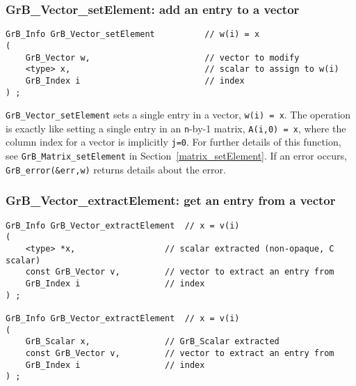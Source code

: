\documentclass[12pt]{article}
\begin{document}
\newpage
\subsubsection{{\sf GrB\_Vector\_setElement:}    add an entry to a vector}
\label{vector_setElement}

\begin{mdframed}[userdefinedwidth=6in]
{\footnotesize
\begin{verbatim}
GrB_Info GrB_Vector_setElement          // w(i) = x
(
    GrB_Vector w,                       // vector to modify
    <type> x,                           // scalar to assign to w(i)
    GrB_Index i                         // index
) ;
\end{verbatim} } \end{mdframed}

\verb'GrB_Vector_setElement' sets a single entry in a vector, \verb'w(i) = x'.
The operation is exactly like setting a single entry in an \verb'n'-by-1
matrix, \verb'A(i,0) = x', where the column index for a vector is implicitly
\verb'j=0'.  For further details of this function, see
\verb'GrB_Matrix_setElement' in Section~\ref{matrix_setElement}.
If an error occurs, \verb'GrB_error(&err,w)' returns details about the error.

\subsubsection{{\sf GrB\_Vector\_extractElement:} get an entry from a vector}
\label{vector_extractElement}

\begin{mdframed}[userdefinedwidth=6in]
{\footnotesize
\begin{verbatim}
GrB_Info GrB_Vector_extractElement  // x = v(i)
(
    <type> *x,                  // scalar extracted (non-opaque, C scalar)
    const GrB_Vector v,         // vector to extract an entry from
    GrB_Index i                 // index
) ;

GrB_Info GrB_Vector_extractElement  // x = v(i)
(
    GrB_Scalar x,               // GrB_Scalar extracted
    const GrB_Vector v,         // vector to extract an entry from
    GrB_Index i                 // index
) ;
\end{verbatim} } \end{mdframed}
\end{document}
